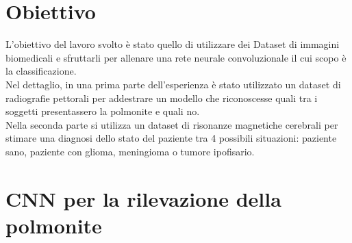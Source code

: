 \section{Obiettivo}
L’obiettivo del lavoro svolto è stato quello di utilizzare dei Dataset di immagini biomedicali e sfruttarli per allenare una rete neurale convoluzionale il cui scopo è la classificazione. \\
Nel dettaglio, in una prima parte dell'esperienza è stato utilizzato un dataset di radiografie pettorali per addestrare un modello che riconoscesse quali tra i soggetti presentassero la polmonite e quali no. \\
Nella seconda parte si utilizza un dataset di risonanze magnetiche cerebrali per stimare una diagnosi dello stato del paziente tra 4 possibili situazioni: paziente sano, paziente con glioma, meningioma o tumore ipofisario. \\


\section{CNN per la rilevazione della polmonite}
